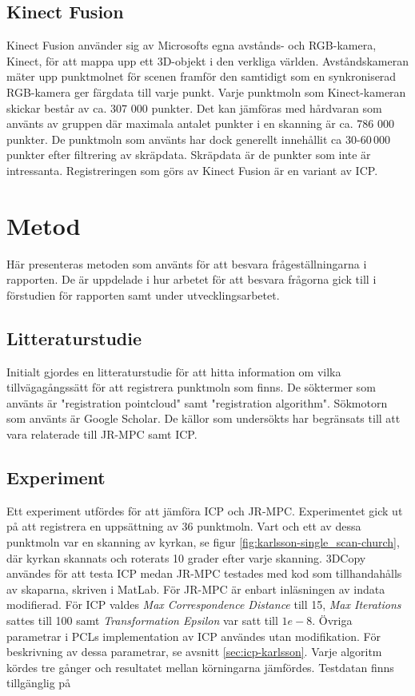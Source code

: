 \subsection{Kinect Fusion}
\label{sec:kinect-karlsson}
Kinect Fusion använder sig av Microsofts egna avstånds- och RGB-kamera, Kinect, för att mappa upp ett 3D-objekt i den verkliga världen. Avståndskameran mäter upp punktmolnet för scenen framför den samtidigt som en synkroniserad RGB-kamera ger färgdata till varje punkt. 
Varje punktmoln som Kinect-kameran skickar består av ca. 307 000 punkter. Det kan jämföras med hårdvaran som använts av gruppen där maximala antalet punkter i en skanning är ca. 786 000 punkter. De punktmoln som använts har dock generellt innehållit ca 30-60\,000 punkter efter filtrering av skräpdata. Skräpdata är de punkter som inte är intressanta. Registreringen som görs av Kinect Fusion är en variant av ICP.

\section{Metod}
\label{sec:method-karlsson}

Här presenteras metoden som använts för att besvara frågeställningarna i rapporten. De är uppdelade i hur arbetet för att besvara frågorna gick till i förstudien för rapporten samt under utvecklingsarbetet.

\subsection{Litteraturstudie}
Initialt gjordes en litteraturstudie för att hitta information om vilka tillvägagångssätt för att registrera punktmoln som finns. De söktermer som använts är "registration pointcloud" samt "registration algorithm". Sökmotorn som använts är Google Scholar. De källor som undersökts har begränsats till att vara relaterade till JR-MPC samt ICP.

\subsection{Experiment}
Ett experiment utfördes för att jämföra ICP och JR-MPC. Experimentet gick ut på att registrera en uppsättning av 36 punktmoln. Vart och ett av dessa punktmoln var en skanning av kyrkan, se figur \ref{fig:karlsson-single_scan-church}, där kyrkan skannats och roterats 10 grader efter varje skanning. 3DCopy användes för att testa ICP medan JR-MPC testades med kod som tillhandahålls av skaparna, skriven i MatLab. För JR-MPC är enbart inläsningen av indata modifierad. För ICP valdes \textit{Max Correspondence Distance} till 15, \textit{Max Iterations} sattes till 100 samt \textit{Transformation Epsilon} var satt till $ 1e-8 $. Övriga parametrar i PCLs implementation av ICP användes utan modifikation. För beskrivning av dessa parametrar, se avsnitt \ref{sec:icp-karlsson}. Varje algoritm kördes tre gånger och resultatet mellan körningarna jämfördes. Testdatan finns tillgänglig på %

